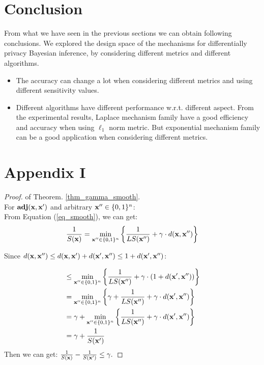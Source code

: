 \documentclass{article}
\begin{document}
\section{Conclusion}
From what we have seen in the previous sections we can obtain following conclusions. We explored the design space of the mechanisms for differentially privacy Bayesian inference, by considering different metrics and different algorithms.
\begin{itemize}
  \item The accuracy can change a lot when considering different metrics and using different sensitivity values.
  \item Different algorithms have different performance w.r.t. different aspect. From the experimental results, Laplace mechanism family have a good efficiency and accuracy when using $\ell_1$ norm metric. But exponential mechanism family can be a good application when considering different metrics.
\end{itemize}





\newpage
\section*{Appendix I}
\label{app_sensitivity}
\begin{proof}
of Theorem. \ref{thm_gamma_smooth}.\\
For $\textbf{adj}(\textbf{x},\textbf{x}')$ and arbitrary $\textbf{x}'' \in \{0,1\}^{n}$:\\
From Equation (\ref{eq_smooth}), we can get:
\[
\frac{1}{S(\textbf{x})} 
 = \min_{\textbf{x}'' \in \{0,1\}^{n}}\bigg \{ \frac{1}{LS(\textbf{x}'')} +\gamma \cdot d(\textbf{x},\textbf{x}'') \bigg \}\\
\]

Since $d(\textbf{x},\textbf{x}'') \leq d(\textbf{x},\textbf{x}') + d(\textbf{x}',\textbf{x}'') \leq 1 + d(\textbf{x}',\textbf{x}'')$:

\begin{equation*}
\begin{split}
& \leq \min_{\textbf{x}'' \in \{0,1\}^{n}}\bigg \{  \frac{1}{LS(\textbf{x}'')} +\gamma \cdot (1 + d(\textbf{x}',\textbf{x}'')) \bigg \}\\
& = \min_{\textbf{x}'' \in \{0,1\}^{n}}\bigg \{
\gamma + \frac{1}{LS(\textbf{x}'')} +\gamma \cdot d(\textbf{x}',\textbf{x}'')\bigg 
\}\\
& = \gamma + \min_{\textbf{x}'' \in \{0,1\}^{n}}\bigg \{
\frac{1}{LS(\textbf{x}'')} +\gamma \cdot d(\textbf{x}',\textbf{x}'')\bigg
\}\\
& = \gamma + \frac{1}{S(\textbf{x}')}
\end{split}
\end{equation*}
Then we can get:
$\frac{1}{S(\textbf{x})} - \frac{1}{S(\textbf{x}')} \leq \gamma.$
\end{proof}
\end{document}

